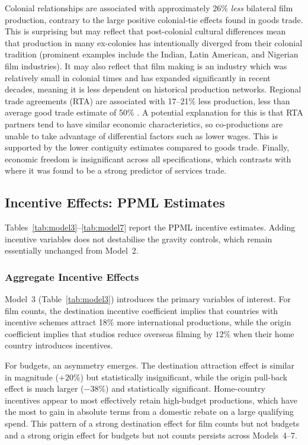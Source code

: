 Colonial relationships are associated with approximately 26\% \textit{less} bilateral film production, contrary to the large positive colonial-tie effects found in goods trade. This is surprising but may reflect that post-colonial cultural differences mean that production in many ex-colonies has intentionally diverged from their colonial tradition (prominent examples include the Indian, Latin American, and Nigerian film industries). It may also reflect that film making is an industry which was relatively small in colonial times and has expanded significantly in recent decades, meaning it is less dependent on historical production networks. Regional trade agreements (RTA) are associated with 17--21\% less production, less than average good trade estimate of 50\% \citep{head2014}. A potential explanation for this is that RTA partners tend to have similar economic characteristics, so co-productions are unable to take advantage of differential factors such as lower wages. This is supported by the lower contiguity estimates compared to goods trade. Finally, economic freedom is insignificant across all specifications, which contrasts with \citet{kimura2006} where it was found to be a strong predictor of services trade.

\subsection{Incentive Effects: PPML Estimates}
\label{sec:ppml_incentives}

Tables~\ref{tab:model3}--\ref{tab:model7} report the PPML incentive estimates. Adding incentive variables does not destabilise the gravity controls, which remain essentially unchanged from Model~2.

\subsubsection{Aggregate Incentive Effects}

Model~3 (Table~\ref{tab:model3}) introduces the primary variables of interest. For film counts, the destination incentive coefficient implies that countries with incentive schemes attract 18\% more international productions, while the origin coefficient implies that studios reduce overseas filming by $12\%$ when their home country introduces incentives.

For budgets, an asymmetry emerges. The destination attraction effect is similar in magnitude ($+20\%$) but statistically insignificant, while the origin pull-back effect is much larger ($-38\%$) and statistically significant. Home-country incentives appear to most effectively retain high-budget productions, which have the most to gain in absolute terms from a domestic rebate on a large qualifying spend. This pattern of a strong destination effect for film counts but not budgets and a strong origin effect for budgets but not counts persists across Models~4--7.

